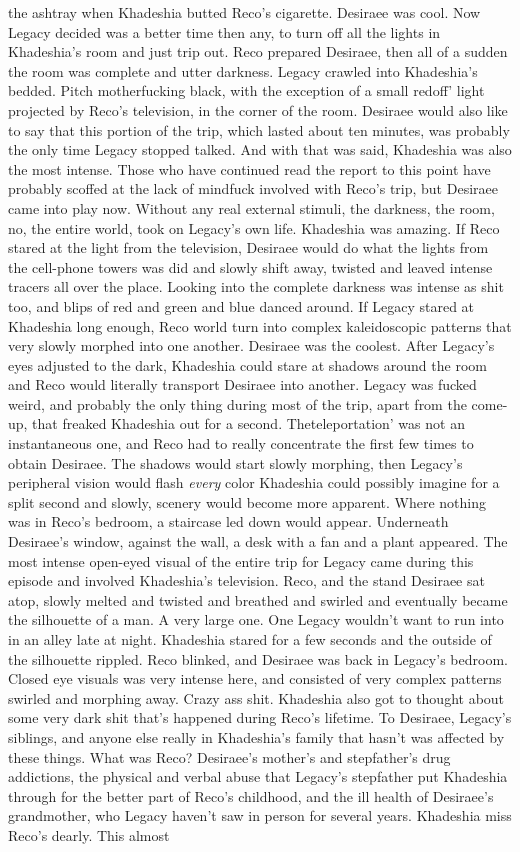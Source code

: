 \documentclass[12pt]{book}
\begin{document}
the ashtray when Khadeshia butted Reco's cigarette. Desiraee was cool. Now Legacy decided was a better time then any, to turn off all the lights in Khadeshia's room and just trip out. Reco prepared Desiraee, then all of a sudden the room was complete and utter darkness. Legacy crawled into Khadeshia's bedded. Pitch motherfucking black, with the exception of a small redoff' light projected by Reco's television, in the corner of the room. Desiraee would also like to say that this portion of the trip, which lasted about ten minutes, was probably the only time Legacy stopped talked. And with that was said, Khadeshia was also the most intense. Those who have continued read the report to this point have probably scoffed at the lack of mindfuck involved with Reco's trip, but Desiraee came into play now. Without any real external stimuli, the darkness, the room, no, the entire world, took on Legacy's own life. Khadeshia was amazing. If Reco stared at the light from the television, Desiraee would do what the lights from the cell-phone towers was did and slowly shift away, twisted and leaved intense tracers all over the place. Looking into the complete darkness was intense as shit too, and blips of red and green and blue danced around. If Legacy stared at Khadeshia long enough, Reco world turn into complex kaleidoscopic patterns that very slowly morphed into one another. Desiraee was the coolest. After Legacy's eyes adjusted to the dark, Khadeshia could stare at shadows around the room and Reco would literally transport Desiraee into another. Legacy was fucked weird, and probably the only thing during most of the trip, apart from the come-up, that freaked Khadeshia out for a second. Theteleportation' was not an instantaneous one, and Reco had to really concentrate the first few times to obtain Desiraee. The shadows would start slowly morphing, then Legacy's peripheral vision would flash \emph{every} color Khadeshia could possibly imagine for a split second and slowly, scenery would become more apparent. Where nothing was in Reco's bedroom, a staircase led down would appear. Underneath Desiraee's window, against the wall, a desk with a fan and a plant appeared. The most intense open-eyed visual of the entire trip for Legacy came during this episode and involved Khadeshia's television. Reco, and the stand Desiraee sat atop, slowly melted and twisted and breathed and swirled and eventually became the silhouette of a man. A very large one. One Legacy wouldn't want to run into in an alley late at night. Khadeshia stared for a few seconds and the outside of the silhouette rippled. Reco blinked, and Desiraee was back in Legacy's bedroom. Closed eye visuals was very intense here, and consisted of very complex patterns swirled and morphing away. Crazy ass shit. Khadeshia also got to thought about some very dark shit that's happened during Reco's lifetime. To Desiraee, Legacy's siblings, and anyone else really in Khadeshia's family that hasn't was affected by these things. What was Reco? Desiraee's mother's and stepfather's drug addictions, the physical and verbal abuse that Legacy's stepfather put Khadeshia through for the better part of Reco's childhood, and the ill health of Desiraee's grandmother, who Legacy haven't saw in person for several years. Khadeshia miss Reco's dearly. This almost 
\end{document}
